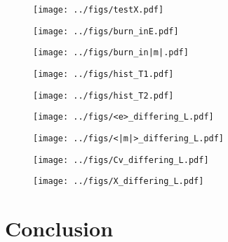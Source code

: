 \documentclass[english,notitlepage,reprint,nofootinbib]{revtex4-1}  %
\begin{document}
\begin{figure}[H]
	\centering
	\texttt{[image: ../figs/testX.pdf]} %
	\caption{}
	\label{fig:testX}
\end{figure}

\begin{figure}[H]
	\centering
	\texttt{[image: ../figs/burn\_inE.pdf]} %
	\caption{}
	\label{fig:burn_inE}
\end{figure}

\begin{figure}[H]
	\centering
	\texttt{[image: ../figs/burn\_in|m|.pdf]} %
	\caption{}
	\label{fig:burn_in|m|}
\end{figure}

\begin{figure}[H]
	\centering
	\texttt{[image: ../figs/hist\_T1.pdf]} %
	\caption{}
	\label{fig:hist_T1}
\end{figure}

\begin{figure}[H]
	\centering
	\texttt{[image: ../figs/hist\_T2.pdf]} %
	\caption{}
	\label{fig:hist_T2}
\end{figure}

\begin{figure}[H]
	\centering
	\texttt{[image: ../figs/<e>\_differing\_L.pdf]} %
	\caption{}
	\label{fig:e_differing}
\end{figure}

\begin{figure}[H]
	\centering
	\texttt{[image: ../figs/<|m|>\_differing\_L.pdf]} %
	\caption{}
	\label{fig:m_differing}
\end{figure}

\begin{figure}[H]
	\centering
	\texttt{[image: ../figs/Cv\_differing\_L.pdf]} %
	\caption{}
	\label{fig:Cv_diff_l}
\end{figure}

\begin{figure}[H]
	\centering
	\texttt{[image: ../figs/X\_differing\_L.pdf]} %
	\caption{}
	\label{fig:X_diff_l}
\end{figure}


 
\section{Conclusion}\label{sec:conclusion}
\end{document}
